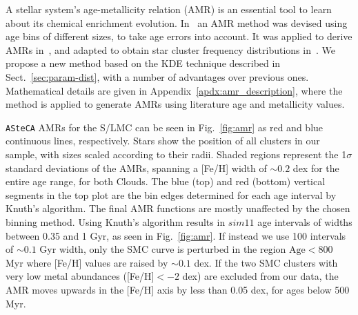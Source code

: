 \documentclass[draft]{aa}
\begin{document}
A stellar system's age-metallicity relation (AMR) is an essential tool to learn
about its chemical enrichment evolution.
%
In~\cite{Piatti_2010_AMR} an AMR method was devised using age bins of different
sizes, to take age errors into account. It was applied to derive AMRs
in~\cite{Piatti_Geisler_2013}, and adapted to obtain star cluster frequency
distributions in~\cite{Piatti_2013_CF}.
%
We propose a new method based on the KDE technique described in
Sect.~\ref{sec:param-dist}, with a number of advantages over previous ones.
Mathematical details are given in Appendix~\ref{apdx:amr_description}, where
the method is applied to generate AMRs using literature age and metallicity
values.

\texttt{ASteCA} AMRs for the S/LMC can be seen in Fig.~\ref{fig:amr} as red and
blue continuous lines, respectively. Stars show the position of all clusters in
our sample, with sizes scaled according to their radii.
%
Shaded regions represent the 1$\sigma$ standard deviations of the AMRs, spanning
a [Fe/H] width of ${\sim}0.2$ dex for the entire age range, for both Clouds.
The blue (top) and red (bottom) vertical segments in the top plot are the bin
edges determined for each age interval by Knuth's algorithm.
%
The final AMR functions are mostly unaffected by the chosen binning method.
Using Knuth's algorithm results in ${sim}11$ age intervals of widths between
0.35 and 1 Gyr, as seen in Fig.~\ref{fig:amr}. If instead we use 100 intervals
of ${\sim}0.1$ Gyr width, only the SMC curve is perturbed in the region
$\mathrm{Age}{<800}$ Myr where [Fe/H] values are raised by ${\sim}0.1$ dex.
%
%
If the two SMC clusters with very low metal abundances ([Fe/H]${<-}2$ dex) are
excluded from our data, the AMR moves upwards in the [Fe/H] axis by less than
0.05 dex, for ages below 500 Myr.
\end{document}
